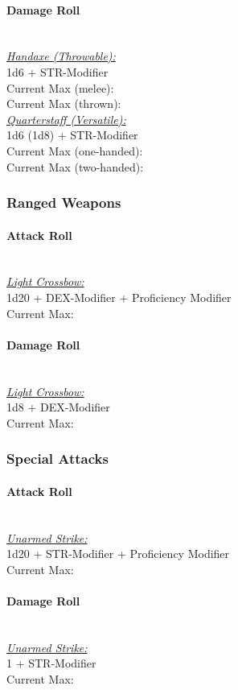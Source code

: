 \documentclass[letterpaper,openany,oneside,twocolumn]{book}
\newcommand{\PATH}{../../}
\begin{document}
\paragraph*{Damage Roll}\hfill\\
\underline{\textit{Handaxe (Throwable):}}\\
1d6 + STR-Modifier\\
\indent Current Max (melee): \\
\indent Current Max (thrown): 
\\
\underline{\textit{Quarterstaff (Versatile):}}\\
1d6 (1d8) + STR-Modifier\\
\indent Current Max (one-handed): \\
\indent Current Max (two-handed): 
\subsubsection*{Ranged Weapons}
\paragraph*{Attack Roll}\hfill\\
\underline{\textit{Light Crossbow:}}\\
1d20 + DEX-Modifier + Proficiency Modifier\\
\indent Current Max: 
\paragraph*{Damage Roll}\hfill\\
\underline{\textit{Light Crossbow:}}\\
1d8 + DEX-Modifier\\
\indent Current Max: 
\subsubsection*{Special Attacks}
\paragraph*{Attack Roll}\hfill\\
\underline{\textit{Unarmed Strike:}}\\
1d20 + STR-Modifier + Proficiency Modifier\\
\indent Current Max: 
\paragraph*{Damage Roll}\hfill\\
\underline{\textit{Unarmed Strike:}}\\
1 + STR-Modifier\\
\indent Current Max: 


\end{document}
